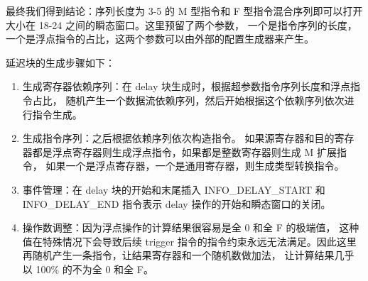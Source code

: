 \begin{table}[h!]
    \begin{center} 
    \caption{整数指令组合} 
    \label{table:int-seq}  
    \end{center}
\end{table}

最终我们得到结论：序列长度为 3-5 的 M 型指令和 F 型指令混合序列即可以打开大小在 18-24 之间的瞬态窗口。这里预留了两个参数，
一个是指令序列的长度，一个是浮点指令的占比，这两个参数可以由外部的配置生成器来产生。\par

延迟块的生成步骤如下：
\begin{enumerate}
    \item 生成寄存器依赖序列：在 delay 块生成时，根据超参数指令序列长度和浮点指令占比，
随机产生一个数据流依赖序列，然后开始根据这个依赖序列依次进行指令生成。\par

    \item 生成指令序列：之后根据依赖序列依次构造指令。
如果源寄存器和目的寄存器都是浮点寄存器则生成浮点指令，如果都是整数寄存器则生成 M 扩展指令，
如果一个是浮点寄存器，一个是通用寄存器，则生成类型转换指令。\par

    \item 事件管理：在 delay 块的开始和末尾插入 INFO\_DELAY\_START 
和 INFO\_DELAY\_END 指令表示 delay 操作的开始和瞬态窗口的关闭。\par

    \item 操作数调整：因为浮点操作的计算结果很容易是全 0 和全 F 的极端值，
这种值在特殊情况下会导致后续 trigger 指令的指令约束永远无法满足。因此这里再随机产生一条指令，让结果寄存器和一个随机数做加法，
让计算结果几乎以 100\% 的不为全 0 和全 F。\par
\end{enumerate}

